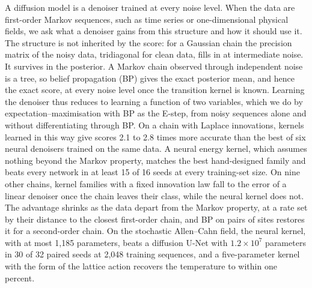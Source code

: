 A diffusion model is a denoiser trained at every noise level. When the data are first-order Markov sequences, such as
time series or one-dimensional physical fields, we ask what a denoiser gains from this structure and how it should use
it. The structure is not inherited by the score: for a Gaussian chain the precision matrix of the noisy data, tridiagonal
for clean data, fills in at intermediate noise. It survives in the posterior. A Markov chain observed through independent
noise is a tree, so belief propagation (BP) gives the exact posterior mean, and hence the exact score, at every noise
level once the transition kernel is known. Learning the denoiser thus reduces to learning a function of two variables,
which we do by expectation--maximisation with BP as the E-step, from noisy sequences alone and without differentiating
through BP. On a chain with Laplace innovations, kernels learned in this way give scores 2.1 to 2.8 times more accurate
than the best of six neural denoisers trained on the same data. A neural energy kernel, which assumes nothing beyond the
Markov property, matches the best hand-designed family and beats every network in at least 15 of 16 seeds at every
training-set size. On nine other chains, kernel families with a fixed innovation law fall to the error of a linear
denoiser once the chain leaves their class, while the neural kernel does not. The advantage shrinks as the data depart
from the Markov property, at a rate set by their distance to the closest first-order chain, and BP on pairs of sites
restores it for a second-order chain. On the stochastic Allen--Cahn field, the neural kernel, with at most 1{,}185
parameters, beats a diffusion U-Net with $1.2\times10^{7}$ parameters in 30 of 32 paired seeds at 2{,}048 training
sequences, and a five-parameter kernel with the form of the lattice action recovers the temperature to within one
percent.

